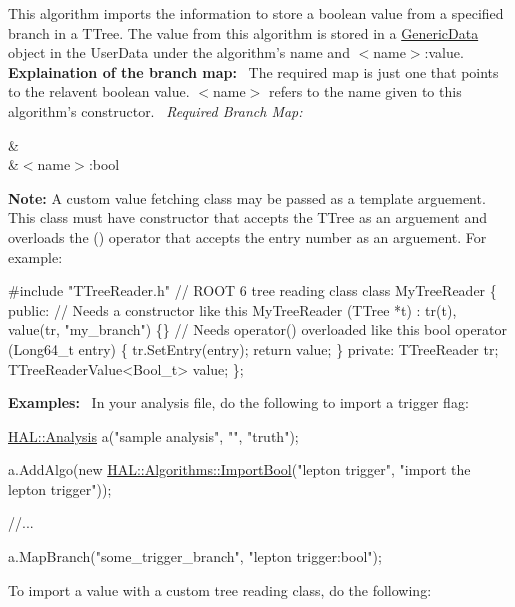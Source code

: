 This algorithm imports the information to store a boolean value from a specified branch in a T\+Tree. The value from this algorithm is stored in a \hyperlink{class_h_a_l_1_1_generic_data}{Generic\+Data} object in the User\+Data under the algorithm's name and $<$name$>$\+:value.~\newline
~\newline
{\bfseries Explaination of the branch map\+:}~\newline
The required map is just one that points to the relavent boolean value. $<$name$>$ refers to the name given to this algorithm's constructor.~\newline
{\itshape Required Branch Map\+:} \begin{TabularC}{2}
\hline
{}&\PBS{}\\
&\PBS\centering $<$name$>$\+:bool \\
\end{TabularC}
{\bfseries Note\+:} A custom value fetching class may be passed as a template arguement. This class must have constructor that accepts the T\+Tree as an arguement and overloads the () operator that accepts the entry number as an arguement. For example\+: 
\begin{DoxyCode}
\textcolor{preprocessor}{#include "TTreeReader.h"} \textcolor{comment}{// ROOT 6 tree reading class}
\textcolor{keyword}{class }MyTreeReader \{
\textcolor{keyword}{public}:
 \textcolor{comment}{// Needs a constructor like this}
 MyTreeReader (TTree *t) : tr(t), value(tr, \textcolor{stringliteral}{"my\_branch"}) \{\}
 \textcolor{comment}{// Needs operator() overloaded like this}
 \textcolor{keywordtype}{bool} operator (Long64\_t entry) \{
   tr.SetEntry(entry);
   \textcolor{keywordflow}{return} value;
 \}
\textcolor{keyword}{private}:
 TTreeReader tr;
 TTreeReaderValue<Bool\_t> value;
\};
\end{DoxyCode}
 {\bfseries Examples\+:}~\newline
In your analysis file, do the following to import a trigger flag\+:


\begin{DoxyCode}
\hyperlink{class_h_a_l_1_1_analysis}{HAL::Analysis} a(\textcolor{stringliteral}{"sample analysis"}, \textcolor{stringliteral}{""}, \textcolor{stringliteral}{"truth"});

a.AddAlgo(\textcolor{keyword}{new} \hyperlink{class_h_a_l_1_1_algorithms_1_1_import_bool_value}{HAL::Algorithms::ImportBool}(\textcolor{stringliteral}{"lepton trigger"}, \textcolor{stringliteral}{"import the lepton
       trigger"}));

\textcolor{comment}{//...}

a.MapBranch(\textcolor{stringliteral}{"some\_trigger\_branch"}, \textcolor{stringliteral}{"lepton trigger:bool"});
\end{DoxyCode}
 To import a value with a custom tree reading class, do the following\+:


